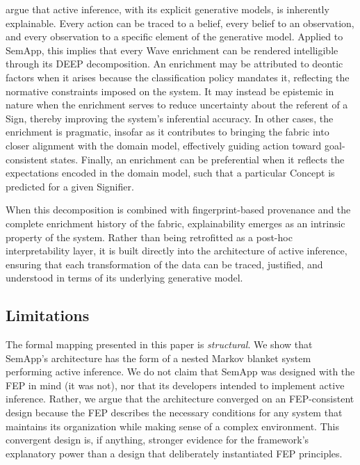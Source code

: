 \documentclass[11pt,a4paper]{article}
\theoremstyle{definition}
\begin{document}
\citet{albarracin2023explainable} argue that active inference, with its explicit generative models, is inherently explainable. Every action can be traced to a belief, every belief to an observation, and every observation to a specific element of the generative model. Applied to SemApp, this implies that every Wave enrichment can be rendered intelligible through its DEEP decomposition. An enrichment may be attributed to deontic factors when it arises because the classification policy mandates it, reflecting the normative constraints imposed on the system. It may instead be epistemic in nature when the enrichment serves to reduce uncertainty about the referent of a Sign, thereby improving the system’s inferential accuracy. In other cases, the enrichment is pragmatic, insofar as it contributes to bringing the fabric into closer alignment with the domain model, effectively guiding action toward goal-consistent states. Finally, an enrichment can be preferential when it reflects the expectations encoded in the domain model, such that a particular Concept is predicted for a given Signifier.

When this decomposition is combined with fingerprint-based provenance and the complete enrichment history of the fabric, explainability emerges as an intrinsic property of the system. Rather than being retrofitted as a post-hoc interpretability layer, it is built directly into the architecture of active inference, ensuring that each transformation of the data can be traced, justified, and understood in terms of its underlying generative model.

\label{sec:discussion}

\subsection{Limitations}

The formal mapping presented in this paper is \emph{structural}. We show that SemApp's architecture has the form of a nested Markov blanket system performing active inference. We do not claim that SemApp was designed with the FEP in mind (it was not), nor that its developers intended to implement active inference. Rather, we argue that the architecture converged on an FEP-consistent design because the FEP describes the necessary conditions for any system that maintains its organization while making sense of a complex environment. This convergent design is, if anything, stronger evidence for the framework's explanatory power than a design that deliberately instantiated FEP principles.
\end{document}
